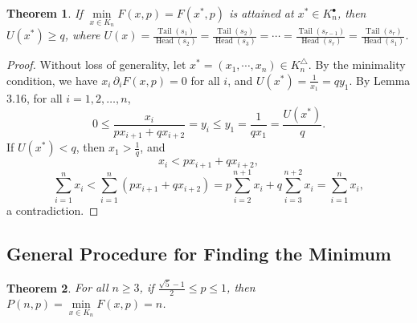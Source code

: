 \documentclass[a4paper,fleqn,numbers]{cas-sc}
\newtheorem{theorem}{Theorem}[section]
\DeclareMathOperator{\Head}{Head}
\DeclareMathOperator{\Tail}{Tail}
\begin{document}
	\begin{theorem}
		If \( \min\limits_{x\in K_n} F(x,p) = F(x^*,p) \) is attained at \( x^*\in K_n^{\bullet} \), then \( U(x^*) \geq q \), where \( U(x) = \frac{\Tail(s_1)}{\Head(s_2)} = \frac{\Tail(s_2)}{\Head(s_3)} = \cdots = \frac{\Tail(s_{r-1})}{\Head(s_r)} = \frac{\Tail(s_r)}{\Head(s_1)}\).
	\end{theorem}
	
	\begin{proof}
		Without loss of generality, let \( x^*=(x_1,\cdots,x_n)\in K_n^{\triangle} \). By the minimality condition, we have \( x_i\,\partial_i F(x,p)=0 \) for all \( i \), and \( U(x^*)=\frac{1}{x_1}=q y_1 \). By Lemma 3.16, for all \( i=1,2,\ldots,n \),
		\[
		0\leq \frac{x_i}{px_{i+1}+qx_{i+2}} = y_i \leq y_1 = \frac{1}{q x_1} = \frac{U(x^*)}{q}.
		\]
		If \( U(x^*)<q \), then \( x_1 >\frac{1}{q} \), and
		\[
		x_i < p x_{i+1} + q x_{i+2},
		\]
		\[
		\sum_{i=1}^n x_i < \sum_{i=1}^n (p x_{i+1}+q x_{i+2}) = p\sum_{i=2}^{n+1} x_i + q\sum_{i=3}^{n+2} x_i = \sum_{i=1}^n x_i,
		\]
		a contradiction.
	\end{proof}
	
	\subsection{General Procedure for Finding the Minimum}
	
	\begin{theorem}
		For all \( n \geq 3 \), if \( \frac{\sqrt{5}-1}{2}\leq p \leq 1 \), then \( P(n,p)=\min\limits_{x \in K_n} F(x,p)=n \).
	\end{theorem}
	
\end{document}
